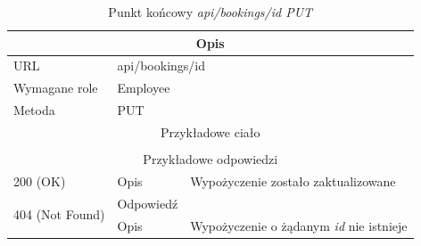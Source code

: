 \documentclass[eng,printmode,openany]{mgr}
\begin{document}
\begin{table}[H]
	\caption{Punkt końcowy \textit{api/bookings/id PUT}}
	\begin{tabularx}{\textwidth}{|l|l|X|}
		\hline
		\multicolumn{3}{|c|}{Opis}                         						                \\ \hline
		URL                       & \multicolumn{2}{l|}{api/bookings/id} 	                \\ \hline
		Wymagane role             & \multicolumn{2}{l|}{Employee}                 \\ \hline	
		Metoda                    & \multicolumn{2}{l|}{PUT} 					                \\ \hline
		\multicolumn{3}{|c|}{Przykładowe ciało}         						                \\ \hline
		\multicolumn{3}{|c|}{} 	\\ \hline
		\multicolumn{3}{|c|}{Przykładowe odpowiedzi}                   		                    \\ \hline
		200 (OK)			& Opis         	& Wypożyczenie zostało zaktualizowane									           \\ \hline
		\multirow{2}{*}{404 (Not Found)} 	& Odpowiedź     &      \\ \cline{2-3} 
		& Opis          & Wypożyczenie o żądanym \textit{id} nie istnieje  							       \\ \hline
	\end{tabularx}
\end{table}
\end{document}
